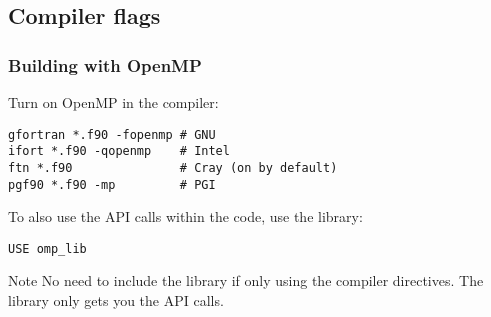 \documentclass{beamer}
\begin{document}
\subsection{Compiler flags}
\begin{frame}[fragile]
\frametitle{Building with OpenMP}

Turn on OpenMP in the compiler:
\begin{verbatim}
gfortran *.f90 -fopenmp # GNU
ifort *.f90 -qopenmp    # Intel
ftn *.f90               # Cray (on by default)
pgf90 *.f90 -mp         # PGI
\end{verbatim}

To also use the API calls within the code, use the library:
\begin{verbatim}
USE omp_lib
\end{verbatim}

\begin{alertblock}{Note}
No need to include the library if only using the compiler directives.
The library only gets you the API calls.
\end{alertblock}
\end{frame}

\end{document}
